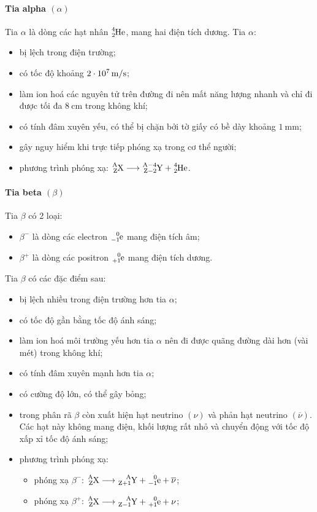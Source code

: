 \begin{tomtat}
	\paragraph{Tia alpha $\left(\alpha\right)$}
	Tia $\alpha$ là dòng các hạt nhân $\ce{^4_2He}$, mang hai điện tích dương. Tia $\alpha$:
	\begin{itemize}
		\item bị lệch trong điện trường;
		\item có tốc độ khoảng $\SI{2E7}{\meter/\second}$;
		\item làm ion hoá các nguyên tử trên đường đi nên mất năng lượng nhanh và chỉ đi được tối đa $\SI{8}{\centi\meter}$ trong không khí;
		\item có tính đâm xuyên yếu, có thể bị chặn bởi tờ giấy có bề dày khoảng $\SI{1}{\milli\meter}$;
		\item gây nguy hiểm khi trực tiếp phóng xạ trong cơ thể người;
		\item phương trình phóng xạ: $\ce{^A_ZX}\longrightarrow\ce{^{A-4}_{Z-2}Y}+\ce{^4_2He}$.
	\end{itemize}
	\paragraph{Tia beta $\left(\beta\right)$}
	Tia $\beta$ có 2 loại:
	\begin{itemize}
		\item $\beta^-$ là dòng các electron $\ce{^0_{-1}e}$ mang điện tích âm;
		\item $\beta^+$ là dòng các positron $\ce{^0_{+1}e}$ mang điện tích dương.
	\end{itemize}
	Tia $\beta$ có các đặc điểm sau:
	\begin{itemize}
		\item bị lệch nhiều trong điện trường hơn tia $\alpha$;
		\item có tốc độ gần bằng tốc độ ánh sáng;
		\item làm ion hoá môi trường yếu hơn tia $\alpha$ nên đi được quãng đường dài hơn (vài mét) trong không khí;
		\item có tính đâm xuyên mạnh hơn tia $\alpha$;
		\item có cường độ lớn, có thể gây bỏng;
		\item trong phân rã $\beta$ còn xuất hiện hạt neutrino $\left(\nu\right)$ và phản hạt neutrino $\left(\overline{\nu}\right)$. Các hạt này không mang điện, khối lượng rất nhỏ và chuyển động với tốc độ xấp xỉ tốc độ ánh sáng;
		\item phương trình phóng xạ:
		\begin{itemize}
			\item phóng xạ $\beta^-$: $\ce{^A_ZX}\longrightarrow\ce{^A_{Z+1}Y}+\ce{^0_{-1}e}+\overline{\nu}$;
			\item phóng xạ $\beta^+$: $\ce{^A_ZX}\longrightarrow\ce{^A_{Z-1}Y}+\ce{^0_{+1}e}+\nu$;
		\end{itemize}
	\end{itemize}

\end{tomtat}
